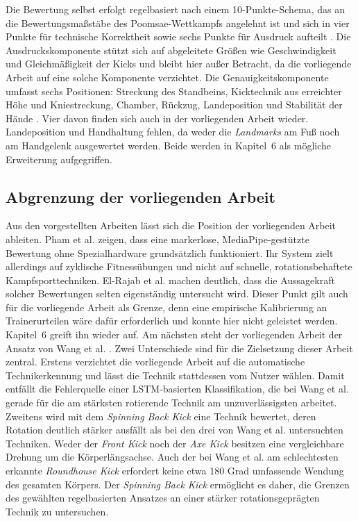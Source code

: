 \documentclass[intern]{cgMA}
\begin{document}
Die Bewertung selbst erfolgt regelbasiert nach einem 10-Punkte-Schema, das an die Bewertungsmaßstäbe des Poomsae-Wettkampfs angelehnt ist und sich in vier Punkte für technische Korrektheit sowie sechs Punkte für Ausdruck aufteilt \cite{Wang2026}. Die Ausdruckskomponente stützt sich auf abgeleitete Größen wie Geschwindigkeit und Gleichmäßigkeit der Kicks und bleibt hier außer Betracht, da die vorliegende Arbeit auf eine solche Komponente verzichtet. 
Die Genauigkeitskomponente umfasst sechs Positionen: Streckung des Standbeins, Kicktechnik aus erreichter Höhe und Kniestreckung, Chamber, Rückzug, Landeposition und Stabilität der Hände \cite{Wang2026}. Vier davon finden sich auch in der vorliegenden Arbeit wieder. Landeposition und Handhaltung fehlen, da weder die \textit{Landmarks} am Fuß noch am Handgelenk ausgewertet werden. Beide werden in Kapitel~6 als mögliche Erweiterung aufgegriffen.

\subsection{Abgrenzung der vorliegenden Arbeit}
Aus den vorgestellten Arbeiten lässt sich die Position der vorliegenden Arbeit ableiten. Pham et al. \cite{Pham2022} zeigen, dass eine markerlose, MediaPipe-gestützte Bewertung ohne Spezialhardware grundsätzlich funktioniert. Ihr System zielt allerdings auf zyklische Fitnessübungen und nicht auf schnelle, rotationsbehaftete Kampfsporttechniken. El-Rajab et al. \cite{ElRajab2025} machen deutlich, dass die Aussagekraft solcher Bewertungen selten eigenständig untersucht wird. Dieser Punkt gilt auch für die vorliegende Arbeit als Grenze, denn eine empirische Kalibrierung an Trainerurteilen wäre dafür erforderlich und konnte hier nicht geleistet werden. Kapitel~6 greift ihn wieder auf.
Am nächsten steht der vorliegenden Arbeit der Ansatz von Wang et al. \cite{Wang2026}. Zwei Unterschiede sind für die Zielsetzung dieser Arbeit zentral.
Erstens verzichtet die vorliegende Arbeit auf die automatische Technikerkennung und lässt die Technik stattdessen vom Nutzer wählen. Damit entfällt die Fehlerquelle einer LSTM-basierten Klassifikation, die bei Wang et al. gerade für die am stärksten rotierende Technik am unzuverlässigsten arbeitet. 
Zweitens wird mit dem \textit{Spinning Back Kick} eine Technik bewertet, deren Rotation deutlich stärker ausfällt als bei den drei von Wang et al. untersuchten Techniken. Weder der \textit{Front Kick} noch der \textit{Axe Kick} besitzen eine vergleichbare Drehung um die Körperlängsachse. Auch der bei Wang et al. am schlechtesten erkannte \textit{Roundhouse Kick} erfordert keine etwa 180 Grad umfassende Wendung des gesamten Körpers. Der \textit{Spinning Back Kick} ermöglicht es daher, die Grenzen des gewählten regelbasierten Ansatzes an einer stärker rotationsgeprägten Technik zu untersuchen.
\end{document}
